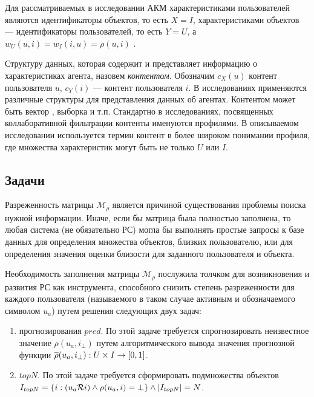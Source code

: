 Для рассматриваемых в исследовании АКМ характеристиками
пользователей являются идентификаторы объектов, то есть
$X = I$, характеристиками объектов --- идентификаторы пользователей,
то есть $Y = U$, а $w_U(u, i) = w_I(i, u) = \rho(u, i)$
\cite{rs-in-compsciense}.

Структуру данных, которая содержит и представляет информацию о характеристиках агента, назовем
{\it контентом}. Обозначим $c_X(u)$ контент пользователя $u$, $c_Y(i)$ ---
контент пользователя $i$. В исследованиях применяются различные структуры для
представления данных об агентах. Контентом может быть вектор \cite{vsm1},
выборка  \cite{rs-handbook} и т.п.
Стандартно в исследованиях, посвященных коллаборативной фильтрации
контенты именуются профилями.
В описываемом
исследовании используется термин контент в более широком понимании
профиля, где множества характеристик могут быть не только $U$
или $I$.

\subsection{Задачи}
Разреженность матрицы $\mathcal{M}_{\rho}$ \cite{sparse1, sparse2, sparse3} является причиной
существования проблемы поиска нужной информации.
Иначе, если бы матрица была полностью заполнена, то любая система (не
обязательно РС) могла
бы выполнять простые запросы к базе данных для определения
множества объектов, близких пользователю, или для определения
значения оценки близости для заданного пользователя и объекта.

Необходимость заполнения матрицы $\mathcal{M}_{\rho}$ послужила толчком для
возникновения и развития РС как инструмента, способного снизить степень
разреженности для каждого пользователя (называемого в таком случае активным
и обозначаемого символом $u_a$) путем решения следующих двух задач:
\begin{enumerate}
	\item прогнозирования $pred$. По этой задаче требуется
		спрогнозировать неизвестное значение $\rho(u_a, i_{\bot})$
		путем алгоритмического вывода значения
		прогнозной функции $\overline{\rho}(u_a, i_{\bot}): U \times I \rightarrow [0,1]$.


\item $topN$. По этой задаче требуется сформировать подмножества объектов
	$I_{topN} = \{i: (u_a \mathcal{R} i) \wedge \rho(u_a, i) = \bot\}
		\wedge |I_{topN}| = N$.
\end{enumerate}
